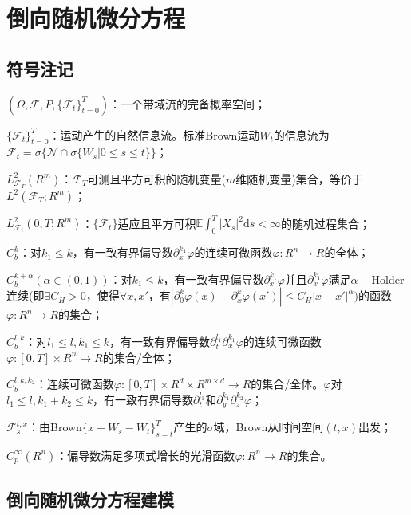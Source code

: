 
\chapter{倒向随机微分方程}\label{cha:bsde}
\section{符号注记}
	\par
	$(\Omega,\mathcal{F},P,\{\mathcal{F}_t\}_{t=0}^T)$：一个带域流的完备概率空间；
	\par
	$\{\mathcal{F}_t\}_{t=0}^T$：运动产生的自然信息流。标准Brown运动$W_t$的信息流为
	$\mathcal{F}_t = \sigma\{\mathcal{N} \cap\sigma\{W_s|0 \leqslant s \leqslant t\}\}$；
	\par
	$L_{\mathcal{F}_T}^2(R^m)$：$\mathcal{F}_T$可测且平方可积的随机变量($m$维随机变量)集合，等价于$L^2(\mathcal{F}_T;R^m)$；
	\par
	$L_{\mathcal{F}_t}^2(0,T;R^m)$：$\{\mathcal{F}_t\}$适应且平方可积$\mathbb{E}\int_0^T|X_s|^2\mathrm{d}s <\infty$的随机过程集合；
	\par
	$C_b^k$：对$k_1 \leqslant k$，有一致有界偏导数$\partial _x^{k_1}\varphi$的连续可微函数$\varphi:R^n\to R$的全体；
	\par
	$C_b^{k+\alpha}(\alpha\in (0,1))$：对$k_1 \leqslant k$，有一致有界偏导数$\partial _x^{k_1}\varphi$并且$\partial _x^{k_1}\varphi$满足$\alpha-$Holder连续(即$\exists C_H >0$，使得$\forall x,x'$，有$|\partial _0^{k}\varphi(x)-\partial _x^{k}\varphi(x')| \leqslant C_H|x-x'|^\alpha)$的函数$\varphi:R^n\to R$的集合；
	\par
	$C_b^{l,k}$：对$l_1 \leqslant l, k_1 \leqslant k$，有一致有界偏导数$\partial _t^{l_1}\partial _x^{k_1}\varphi$的连续可微函数$\varphi:[0,T]\times R^n\to R$的集合/全体；
	\par
	$C_b^{l,k,k_2}$：连续可微函数$\varphi:[0,T]\times R^d \times R^{m\times d}\to R$的集合/全体。$\varphi$对$l_1 \leqslant l, k_1 +k_2 \leqslant k$，有一致有界偏导数$\partial _t^{l_1}$和$\partial _y^{k_1}\partial _z^{k_2}\varphi$；
	\par
	$\mathcal{F}_s^{t,x}$：由Brown$\{x+W_s-W_t\}_{s=t}^T$产生的$\sigma$域，Brown从时间空间$(t,x)$出发；
	\par
	$C_p^\infty(R^n)$：偏导数满足多项式增长的光滑函数$\varphi:R^n\to R$的集合。


\section{倒向随机微分方程建模}
	\label{sec:de-bsde-modeling}
